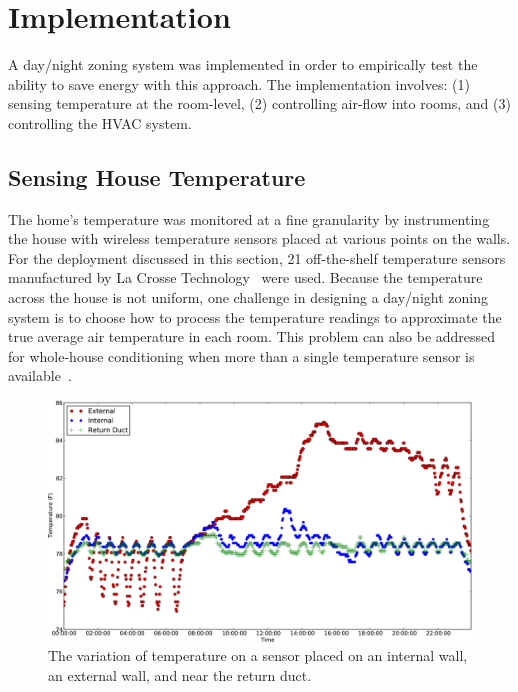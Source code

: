 \section{Implementation}
\label{sec:implementation}

A day/night zoning system was implemented in order to empirically test the
ability to save energy with this approach. The implementation involves: (1)
sensing temperature at the room-level, (2) controlling air-flow into rooms, and
(3) controlling the HVAC system.

\subsection{Sensing House Temperature}
\label{subsec:sensingTemperature}

The home's temperature was monitored at a fine granularity by instrumenting the
house with wireless temperature sensors placed at various points on the
walls. For the deployment discussed in this section, 21 off-the-shelf
temperature sensors manufactured by La Crosse Technology~\cite{LaCrosse} were
used.  Because the temperature across the house is not uniform, one challenge in
designing a day/night zoning system is to choose how to process the temperature
readings to approximate the true average air temperature in each room.  This
problem can also be addressed for whole-house conditioning when more than a
single temperature sensor is available~\cite{lin2002multi}.

\begin{figure}[t]
  \centering
  \includegraphics[width=0.6\columnwidth]{fig/intExtTherm.eps}
  \caption[Effect of Sensor Location on Temperature Reading]{The variation of
    temperature on a sensor placed on an internal wall, an external wall, and
    near the return duct.}
  \label{fig:intExtTherm}
\end{figure}

